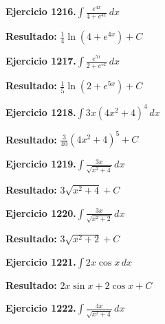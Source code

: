 \documentclass[10pt,a4paper]{article}
\begin{document}
\newpage
\begin{ejbox}
\textbf{Ejercicio 1216.}\quad $\int \frac{e^{4x}}{4+e^{4x}}\,dx$
\end{ejbox}

\begin{solbox}
\textbf{Resultado:} \(\displaystyle \frac{1}{4}\ln(4+e^{4x}) + C\)
\end{solbox}

\begin{ejbox}
\textbf{Ejercicio 1217.}\quad $\int \frac{e^{5x}}{2+e^{5x}}\,dx$
\end{ejbox}

\begin{solbox}
\textbf{Resultado:} \(\displaystyle \frac{1}{5}\ln(2+e^{5x}) + C\)
\end{solbox}

\begin{ejbox}
\textbf{Ejercicio 1218.}\quad $\int 3x(4x^2 + 4)^{4}\,dx$
\end{ejbox}

\begin{solbox}
\textbf{Resultado:} \(\displaystyle \frac{3}{40}(4x^2+4)^{5} + C\)
\end{solbox}

\newpage
\begin{ejbox}
\textbf{Ejercicio 1219.}\quad $\int \frac{3x}{\sqrt{x^2+4}}\,dx$
\end{ejbox}

\begin{solbox}
\textbf{Resultado:} \(\displaystyle 3\sqrt{x^2+4} + C\)
\end{solbox}

\begin{ejbox}
\textbf{Ejercicio 1220.}\quad $\int \frac{3x}{\sqrt{x^2+2}}\,dx$
\end{ejbox}

\begin{solbox}
\textbf{Resultado:} \(\displaystyle 3\sqrt{x^2+2} + C\)
\end{solbox}

\begin{ejbox}
\textbf{Ejercicio 1221.}\quad $\int 2x \cos x\,dx$
\end{ejbox}

\begin{solbox}
\textbf{Resultado:} \(\displaystyle 2x\sin x + 2\cos x + C\)
\end{solbox}

\newpage
\begin{ejbox}
\textbf{Ejercicio 1222.}\quad $\int \frac{4x}{\sqrt{x^2+4}}\,dx$
\end{ejbox}
\end{document}
